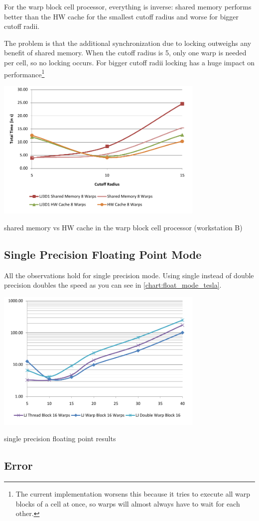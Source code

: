 For the warp block cell processor, everything is inverse: shared memory performs better than the HW cache for the smallest cutoff radius and worse for bigger cutoff radii.

The problem is that the additional synchronization due to locking outweighs any benefit of shared memory. When the cutoff radius is 5, only one warp is needed per cell, so no locking occurs. For bigger cutoff radii locking has a huge impact on performance\footnote{The current implementation worsens this because it tries to execute all warp blocks of a cell at once, so warps will almost always have to wait for each other.}

\begin{chart}
\centering
\includegraphics[width=0.75\textwidth]{plots/wbcp_mode_comp_tesla.pdf}
\caption{shared memory vs HW cache in the warp block cell processor (workstation B)}
\label{chart:wbcp_mode_comp_tesla}
\end{chart}

\subsection{Single Precision Floating Point Mode}
All the observations hold for single precision mode. Using single instead of double precision doubles the speed as you can see in \autoref{chart:float_mode_tesla}.

\begin{chart}
\centering
\includegraphics[width=0.75\textwidth]{plots/float_mode_tesla.pdf}
\caption{single precision floating point results}
\label{chart:float_mode_tesla}
\end{chart}

\subsection{Error}

